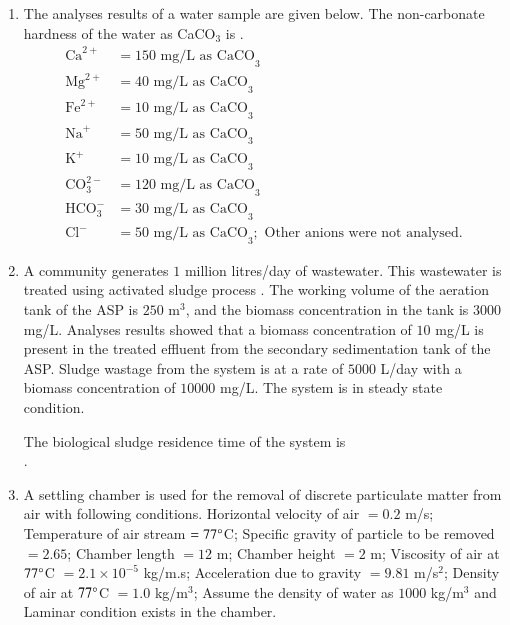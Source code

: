 \documentclass[journal,12pt,onecolumn]{article}
\theoremstyle{remark}
\begin{document}
\begin{enumerate}
    \hfill{}
    
    \item The analyses results of a water sample are given below. The non-carbonate hardness of the water  as CaCO$_3$ is \underline{\hspace{2cm}} .
    \begin{align*}
        \text{Ca}^{2+} &= 150 \text{ mg/L as CaCO}_3 \\
        \text{Mg}^{2+} &= 40 \text{ mg/L as CaCO}_3 \\
        \text{Fe}^{2+} &= 10 \text{ mg/L as CaCO}_3 \\
        \text{Na}^{+} &= 50 \text{ mg/L as CaCO}_3 \\
        \text{K}^{+} &= 10 \text{ mg/L as CaCO}_3 \\
        \text{CO}_3^{2-} &= 120 \text{ mg/L as CaCO}_3 \\
        \text{HCO}_3^{-} &= 30 \text{ mg/L as CaCO}_3 \\
        \text{Cl}^{-} &= 50 \text{ mg/L as CaCO}_3; \text{ Other anions were not analysed.}
    \end{align*}
    
    \hfill{}
    
    \item A community generates $1$ million litres/day  of wastewater. This wastewater is treated using activated sludge process . The working volume of the aeration tank of the ASP is $250$ m$^3$, and the biomass concentration in the tank is $3000$ mg/L. Analyses results showed that a biomass concentration of $10$ mg/L is present in the treated effluent from the secondary sedimentation tank of the ASP. Sludge wastage from the system is at a rate of $5000$ L/day with a biomass concentration of $10000$ mg/L. The system is in steady state condition.
    
    The biological sludge residence time  of the system  is \underline{\hspace{2cm}} \\ .
    
    \hfill{}
    
    \item A settling chamber is used for the removal of discrete particulate matter from air with following conditions. Horizontal velocity of air $= 0.2$ m/s; Temperature of air stream $= 77\degree$C; Specific gravity of particle to be removed $= 2.65$; Chamber length $= 12$ m; Chamber height $= 2$ m; Viscosity of air at $77\degree$C $= 2.1 \times 10^{-5}$ kg/m.s; Acceleration due to gravity  $= 9.81$ m/s$^2$; Density of air at $77\degree$C $= 1.0$ kg/m$^3$; Assume the density of water as $1000$ kg/m$^3$ and Laminar condition exists in the chamber.
    

\end{enumerate}
\end{document}
